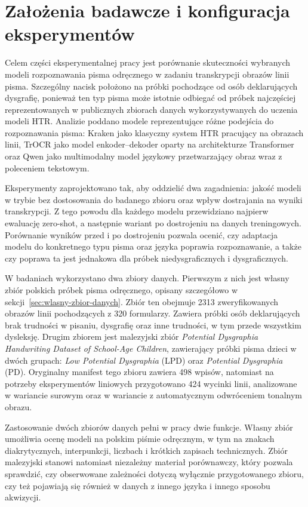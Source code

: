 \section{Założenia badawcze i konfiguracja eksperymentów}
\label{sec:zalozenia-badawcze-i-konfiguracja-eksperymentow}

Celem części eksperymentalnej pracy jest porównanie skuteczności wybranych modeli rozpoznawania
pisma odręcznego w zadaniu transkrypcji obrazów linii pisma. Szczególny nacisk położono na
próbki pochodzące od osób deklarujących dysgrafię, ponieważ ten typ pisma może istotnie odbiegać
od próbek najczęściej reprezentowanych w publicznych zbiorach danych wykorzystywanych do uczenia
modeli HTR. Analizie poddano modele reprezentujące różne podejścia do rozpoznawania pisma:
Kraken jako klasyczny system HTR pracujący na obrazach linii, TrOCR jako model
enkoder--dekoder oparty na architekturze Transformer oraz Qwen jako multimodalny model językowy
przetwarzający obraz wraz z poleceniem tekstowym.

Eksperymenty zaprojektowano tak, aby oddzielić dwa zagadnienia: jakość modeli w trybie
bez dostosowania do badanego zbioru oraz wpływ dostrajania na wyniki transkrypcji. Z tego powodu
dla każdego modelu przewidziano najpierw ewaluację zero-shot, a następnie wariant po dostrojeniu
na danych treningowych. Porównanie wyników przed i po dostrojeniu pozwala ocenić, czy adaptacja
modelu do konkretnego typu pisma oraz języka poprawia rozpoznawanie, a także czy poprawa ta jest
jednakowa dla próbek niedysgraficznych i dysgraficznych.

W badaniach wykorzystano dwa zbiory danych. Pierwszym z nich jest własny zbiór polskich próbek
pisma odręcznego, opisany szczegółowo w sekcji~\ref{sec:wlasny-zbior-danych}. Zbiór ten obejmuje
2313 zweryfikowanych obrazów linii pochodzących z 320 formularzy. Zawiera próbki osób
deklarujących brak trudności w pisaniu, dysgrafię oraz inne trudności, w tym przede wszystkim
dysleksję. Drugim zbiorem jest malezyjski zbiór \textit{Potential Dysgraphia Handwriting Dataset
of School-Age Children}, zawierający próbki pisma dzieci w dwóch grupach: \textit{Low Potential
Dysgraphia} (LPD) oraz \textit{Potential Dysgraphia} (PD). Oryginalny manifest tego zbioru
zawiera 498 wpisów, natomiast na potrzeby eksperymentów liniowych przygotowano 424 wycinki linii,
analizowane w wariancie surowym oraz w wariancie z automatycznym odwróceniem tonalnym obrazu.

Zastosowanie dwóch zbiorów danych pełni w pracy dwie funkcje. Własny zbiór umożliwia ocenę
modeli na polskim piśmie odręcznym, w tym na znakach diakrytycznych, interpunkcji, liczbach
i krótkich zapisach technicznych. Zbiór malezyjski stanowi natomiast niezależny materiał
porównawczy, który pozwala sprawdzić, czy obserwowane zależności dotyczą wyłącznie przygotowanego
zbioru, czy też pojawiają się również w danych z innego języka i innego sposobu akwizycji.

